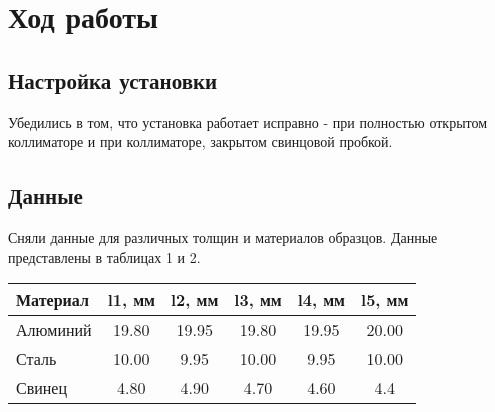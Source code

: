 

\section{Ход работы}

\subsection{Настройка установки}

Убедились в том, что установка работает исправно - при полностью открытом коллиматоре и при
коллиматоре, закрытом свинцовой пробкой.

\subsection{Данные}

Сняли данные для различных толщин и материалов образцов. Данные представлены в таблицах 1
и 2.

\begin{table}[h!]
    \begin{center}

        \begin{tabular}{|l|c|c|c|c|c|}
        \hline
        Материал & l1, мм & l2, мм & l3, мм & l4, мм & l5, мм \\ \hline
        Алюминий & 19.80  & 19.95  & 19.80  & 19.95  & 20.00  \\ \hline
        Сталь    & 10.00  & 9.95   & 10.00  & 9.95   & 10.00  \\ \hline
        Свинец   & 4.80   & 4.90   & 4.70   & 4.60   & 4.4    \\ \hline
        \end{tabular}

    \end{center}
\end{table}

